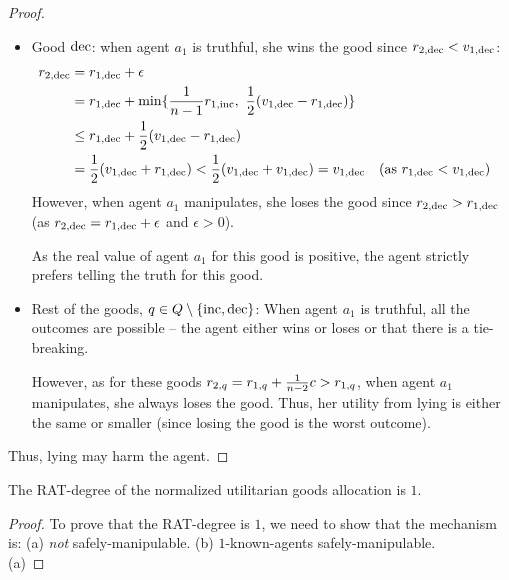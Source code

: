 \begin{proof}
\begin{itemize}
        
        \item Good $\mathrm{dec}$: when agent $a_1$ is truthful, she wins the good since $r_{2,\mathrm{dec}} < v_{1,\mathrm{dec}}$:
        \begin{align*}
            r_{2,\mathrm{dec}} &= r_{1,\mathrm{dec}} + \epsilon \\
            &= r_{1,\mathrm{dec}} + \min \{\frac{1}{n-1}r_{1,\mathrm{inc}},~ \frac{1}{2}(v_{1,\mathrm{dec}} - r_{1,\mathrm{dec}})\}\\
            &\leq r_{1,\mathrm{dec}} +  \frac{1}{2}(v_{1,\mathrm{dec}} - r_{1,\mathrm{dec}}) \\
            &= \frac{1}{2}(v_{1,\mathrm{dec}} + r_{1,\mathrm{dec}})< \frac{1}{2}(v_{1,\mathrm{dec}} + v_{1,\mathrm{dec}}) = v_{1,\mathrm{dec}} && \text{(as $r_{1,\mathrm{dec}} < v_{1,\mathrm{dec}}$)}
        \end{align*}
        However, when agent $a_1$ manipulates, she loses the good since $r_{2,\mathrm{dec}} > r_{1,\mathrm{dec}}$ (as $r_{2,\mathrm{dec}} = r_{1,\mathrm{dec}} + \epsilon$ and $\epsilon > 0$).
        
        As the real value of agent $a_1$ for this good is positive, the agent strictly prefers telling the truth for this good.

        \item Rest of the goods, $q \in Q \setminus \{\mathrm{inc}, \mathrm{dec}\}$: 
        When agent $a_1$ is truthful, all the outcomes are possible -- the agent either wins or loses or that there is a tie-breaking.    
        
        However, as for these goods $r_{2,q} = r_{1,q}+\frac{1}{n-2}c > r_{1,q}$, when agent $a_1$ manipulates, she always loses the good.
        Thus, her utility from lying is either the same or smaller (since losing the good is the worst outcome).
    \end{itemize}

    Thus, lying may harm the agent.
\end{proof}




\begin{claim}
    The RAT-degree of the normalized utilitarian goods allocation is $1$.
\end{claim}

\begin{proof}
    To prove that the RAT-degree is $1$, we need to show that the mechanism is:
    (a) \emph{not} safely-manipulable.
    (b) $1$-known-agents safely-manipulable.\\

    (a)
\end{proof}

